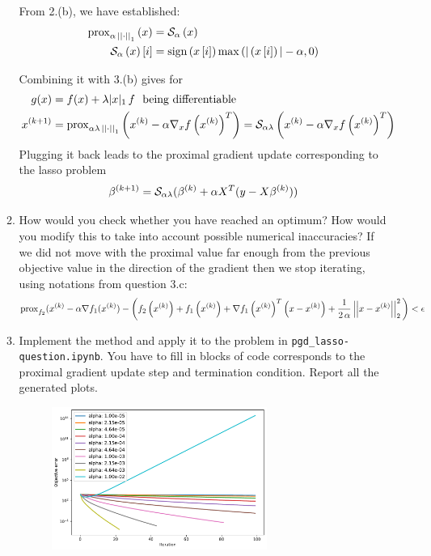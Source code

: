 \documentclass[12pt,twoside]{article}
\begin{document}
\begin{enumerate}
\begin{enumerate}
 From 2.(b), we have established:
 \begin{align*}
\operatorname{prox}_{\alpha \, \left|\left|  \cdot  \right|\right| _{1}}\left(  x  \right) & = \mathcal{ S }_{\alpha}\left( x \right) \\
\mathcal{ S }_{\alpha}\left( x \right)[i] &=  \operatorname{sign}{\left( x\,[i] \right)} \max{ (|\left( x\,[i] \right) | - \alpha , 0) } \\
\end{align*}


Combining it with 3.(b) gives for
 \begin{align*}
 	g(x) &= f(x) + \lambda |x|_1 \, f \text{~ being differentiable} \\
 x^{(k+1)} &= 	\operatorname{prox}_{\alpha \lambda \, \left|\left|  \cdot  \right|\right| _{1}}\left(  x^{(k)}  - \alpha \nabla_x f\left( x^{(k)} \right)^T  \right) = \mathcal{ S }_{\alpha \lambda}\left( x^{(k)}  - \alpha \nabla_x f\left( x^{(k)} \right)^T  \right)
\end{align*}
Plugging it back leads to the proximal gradient update corresponding to the lasso problem 
$$
	 \beta^{(k+1)} =  \mathcal{ S }_{\alpha \lambda} 	(\beta^{(k)} + \alpha X^T (y - X \beta^{(k)}))
$$

 \item How would you check whether you have reached an optimum? How would you modify this to take into account possible numerical inaccuracies?
 If we did not move with the proximal value far enough from the previous objective value in the direction of the gradient then we stop iterating, using notations from question 3.c:
 $$
  \operatorname{prox}_{f_2} (x^{(k)}  - \alpha \nabla f_1 (x^{(k)}) - \bigg( f_2\left( x^{(k)} \right) + f_1\left( x^{(k)} \right) + \nabla f_1\left( x^{(k)} \right)^T\left( x-x^{(k)} \right) +  \frac{1}{2 \, \alpha }\left|\left| x-x^{(k)} \right|\right| _{2}^2 \bigg) < \epsilon
 $$
 
 \item Implement the method and apply it to the problem in \texttt{pgd\_lasso-question.ipynb}. You have to fill in blocks of code corresponds to the proximal gradient update step and termination condition. Report all the generated plots.\\
  
    	\begin{figure}[H]
		\centering
		\captionsetup{justification=centering}
		\includegraphics[width=200pt]{code/pgd/objective_error.pdf}
	\end{figure}


\end{enumerate}
\end{enumerate}
\end{document}
